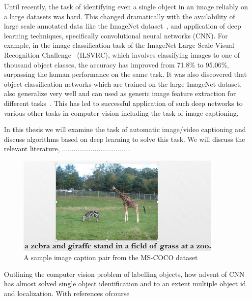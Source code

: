 Until recently, the task of identifying even a single object in an image
reliably on a large datasets was hard.
This changed dramatically with the availability of large scale annotated data
like the ImageNet dataset~\cite{ImagenetOrig}, and  application of deep learning
techniques, specifically convolutional neural networks (CNN).
For example, in the image classification task of the ImageNet Large Scale Visual
Recognition Challenge~\cite{ILSVRC15} (ILSVRC), which involves classifying
images to one of thousand object classes, the accuracy has improved from 71.8\%
to 95.06\%, surpassing the human performance on the same task. 
It was also discovered that object classification networks which are trained on
the large ImageNet dataset, also generalize very well and can used as generic
image feature extraction for different tasks~\cite{yosinski2014transferable}.
This has led to successful application of such deep networks to various other
tasks in computer vision including the task of image captioning.

In this thesis we will examine the task of automatic image/video captioning and
discuss algorithms based on deep learning to solve this task.
We will discuss the relevant literature, ....................................


\begin{figure}[h]
	\centering
	\includegraphics[width=0.9\textwidth]{./images/ExampleCaption.png}
	\caption{A sample image caption pair from the MS-COCO dataset}
	\label{fig:ExampleCap}
\end{figure}


Outlining the computer vision problem of labelling objects, how advent of CNN
has almost solved single object identification and to an extent multiple object
id and localization. With references ofcourse

